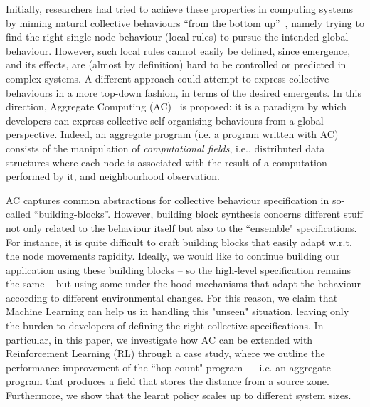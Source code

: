 \documentclass[conference]{IEEEtran}
\begin{document}
Initially, researchers had tried to achieve these properties in computing systems by miming natural collective behaviours ``from the bottom up''~\cite{DBLP:journals/connection/Webb02}, 
 namely trying to find the right single-node-behaviour (local rules)
 to pursue the intended global behaviour. %
%
However, such local rules cannot easily be defined, since emergence, and its effects, are (almost by definition) hard to be controlled or predicted in complex systems.
%
A different approach could attempt to express collective behaviours in a more top-down fashion, in terms of the desired emergents.
In this direction, Aggregate Computing (AC)~\cite{DBLP:journals/computer/BealPV15} is proposed:
 it is a paradigm by which
 developers can express collective self-organising behaviours from a global perspective. %
%
Indeed, an aggregate program 
 (i.e. a program written with AC) 
 consists of the manipulation of \textit{computational fields}, i.e., distributed
 data structures where each node is associated with the result of a computation performed by it,
 and neighbourhood observation.
%

AC captures common abstractions for collective behaviour specification in so-called ``building-blocks''. 
However, building block synthesis concerns different stuff not only related to the behaviour itself
 but also to the ``ensemble" specifications. 
%
For instance, it is quite difficult to craft building blocks
 that easily adapt w.r.t. the node movements rapidity.
%
Ideally, we would like to continue building our application using these building blocks 
 -- so the high-level specification remains the same -- 
 but using some under-the-hood mechanisms that adapt the behaviour according to different environmental changes. 
%
For this reason, we claim that Machine Learning can help us in handling this "unseen" situation, leaving only the burden
 to developers of defining the right collective specifications.
In particular, in this paper,
 we investigate how AC can be extended with Reinforcement Learning (RL) through a case study,
 where we outline the performance improvement of the ``hop count" program ---
 i.e. an aggregate program that produces a field that stores the distance from a source zone. 
 Furthermore, we show that the learnt policy scales up to different system sizes.
\end{document}
